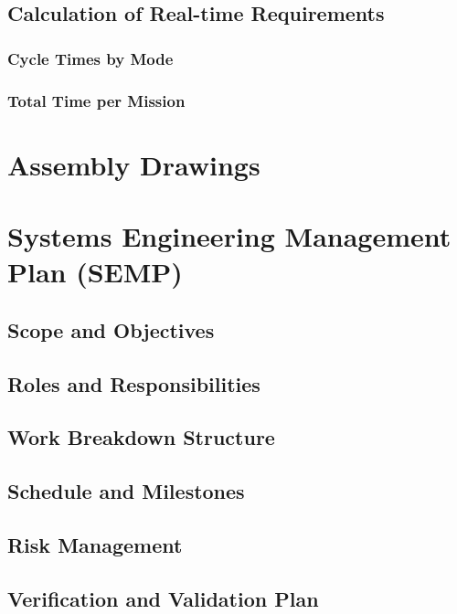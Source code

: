 \documentclass[a4paper,10pt]{article}
\begin{document}
\subsection{Calculation of Real-time Requirements}

\subsubsection{Cycle Times by Mode}

\subsubsection{Total Time per Mission}

\newpage

\section{Assembly Drawings}

\newpage

\section{Systems Engineering Management Plan (SEMP)}

\subsection{Scope and Objectives}

\subsection{Roles and Responsibilities}

\subsection{Work Breakdown Structure}

\subsection{Schedule and Milestones}

\subsection{Risk Management}

\subsection{Verification and Validation Plan}
\end{document}
